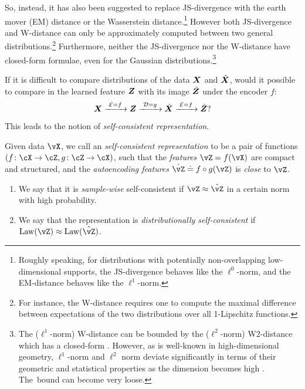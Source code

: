 \documentclass[../../book-main.tex]{subfiles}
\begin{document}
So, instead, it has also been suggested to replace JS-divergence with the earth mover (EM) distance or the Wasserstein distance.\footnote{Roughly speaking, for distributions with potentially non-overlapping low-dimensional supports, the JS-divergence behaves like the $\ell^0$-norm, and the EM-distance behaves like the $\ell^1$-norm.} However both JS-divergence and W-distance can only be approximately computed between two general distributions.\footnote{For instance, the W-distance requires one to compute the maximal difference between expectations of the two distributions over all 1-Lipschitz functions.} Furthermore, neither the JS-divergence nor the W-distance have closed-form formulae, even for the Gaussian distributions.\footnote{The ($\ell^1$-norm) W-distance can be bounded by the ($\ell^2$-norm) W2-distance which has a closed-form \cite{salmona2021gromovwasserstein}. However, as is well-known in high-dimensional geometry, $\ell^1$-norm and $\ell^2$ norm deviate significantly in terms of their geometric and statistical properties as the dimension becomes high \cite{Wright-Ma-2021}. The~bound can become very loose.} 

If it is difficult to compare distributions of the data $\bm{X}$ and $\hat {\bm{X}}$, would it possible to compare in the learned feature $\bm{Z}$ with its image $\hat {\bm{Z}}$ under the encoder $f$: 
\begin{equation}
 \bm{X}
\xrightarrow{\hspace{1mm} \mathcal{E} = f \hspace{1mm}} \bm{Z}  \xrightarrow{\hspace{1mm} \mathcal{D} = g \hspace{1mm}} \hat{\bm{X}} \xrightarrow{\hspace{1mm} \mathcal{E} = f \hspace{1mm}} \hat {\bm{Z}}?
\label{eqn:closed-autoencoding}
\end{equation}
This leads to the notion of {\em self-consistent representation}.
\begin{definition}\label{def:closed_loop}
    Given data \(\vX\), we call an \textit{self-consistent representation} to be a pair of functions \((f \colon \cX \to \cZ, g \colon \cZ \to \cX)\), such that the \textit{features} \(\vZ = f(\vX)\) are compact and structured, and the \textit{autoencoding features} \(\hat{\vZ} \doteq f \circ g(\vZ)\) is \textit{close} to \(\vZ\). 
    \begin{enumerate}
        \item We say that it is \textit{sample-wise} self-consistent if \(\vZ \approx \hat{\vZ}\) in a certain norm  with high probability.
        \item We say that the representation is \textit{distributionally self-consistent} if \(\Law(\vZ) \approx \Law(\hat{\vZ})\).
    \end{enumerate}
\end{definition}
\end{document}
